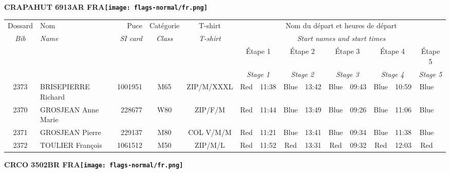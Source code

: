 \documentclass{report}
\begin{document}
\newpage
  \Huge \centering \bfseries CRAPAHUT 6913AR FRA\normalfont \footnotesize \sffamily \hfill \texttt{[image: flags-normal/fr.png]} \newline 
  \begin{longtable}{|c|l|r|c|c|*{5}{cc|}}
    Dossard & Nom  & Puce    & Catégorie & T-shirt & \multicolumn{10}{c|}{Nom du départ et heures de départ} \\
    \itshape Bib     & \itshape Name & \itshape SI card & \itshape Class  & \itshape  T-shirt  & \multicolumn{10}{c|}{\itshape Start names and start times} \\
    \hline
    & & & & & \multicolumn{2}{c|}{Étape 1} & \multicolumn{2}{c|}{Étape 2} & \multicolumn{2}{c|}{Étape 3} & \multicolumn{2}{c|}{Étape 4} & \multicolumn{2}{c|}{Étape 5} \\
    & & & & & \multicolumn{2}{c|}{\itshape Stage 1} & \multicolumn{2}{c|}{\itshape Stage 2} & \multicolumn{2}{c|}{\itshape Stage 3} & \multicolumn{2}{c|}{\itshape Stage 4} & \multicolumn{2}{c|}{\itshape Stage 5} \\
    \hline
    2373 & BRISEPIERRE Richard & 1001951 & M65 & ZIP/M/XXXL & Red & 11:38 & Blue & 13:42 & Blue & 09:43 & Blue & 10:59 & Blue &  \\
    2370 & GROSJEAN Anne Marie & 228677 & W80 & ZIP/F/M & Red & 11:44 & Blue & 13:49 & Blue & 09:26 & Blue & 11:06 & Blue &  \\
    2371 & GROSJEAN Pierre & 229137 & M80 & COL V/M/M & Red & 11:21 & Blue & 13:41 & Blue & 09:34 & Blue & 11:38 & Blue &  \\
    2372 & TOULIER François & 1061512 & M50 & ZIP/M/L & Red & 11:52 & Red & 13:31 & Red & 09:32 & Red & 12:03 & Red &  \\
  \end{longtable}
\newpage
  \Huge \centering \bfseries CRCO 3502BR FRA\normalfont \footnotesize \sffamily \hfill \texttt{[image: flags-normal/fr.png]} \newline 
\end{document}
